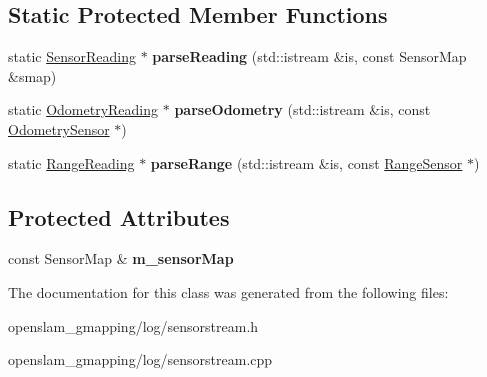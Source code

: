 \subsection*{Static Protected Member Functions}
\begin{DoxyCompactItemize}
\item 
\mbox{\label{classGMapping_1_1SensorStream_aa1a2469698bbe8264b6d0b49f1650615}} 
static \hyperlink{classGMapping_1_1SensorReading}{Sensor\+Reading} $\ast$ {\bfseries parse\+Reading} (std\+::istream \&is, const Sensor\+Map \&smap)
\item 
\mbox{\label{classGMapping_1_1SensorStream_aed9152731b2cd4a3c0a99cd0beca0c33}} 
static \hyperlink{classGMapping_1_1OdometryReading}{Odometry\+Reading} $\ast$ {\bfseries parse\+Odometry} (std\+::istream \&is, const \hyperlink{classGMapping_1_1OdometrySensor}{Odometry\+Sensor} $\ast$)
\item 
\mbox{\label{classGMapping_1_1SensorStream_a451ecf16c146ce840a6518f14b952d1e}} 
static \hyperlink{classGMapping_1_1RangeReading}{Range\+Reading} $\ast$ {\bfseries parse\+Range} (std\+::istream \&is, const \hyperlink{classGMapping_1_1RangeSensor}{Range\+Sensor} $\ast$)
\end{DoxyCompactItemize}
\subsection*{Protected Attributes}
\begin{DoxyCompactItemize}
\item 
\mbox{\label{classGMapping_1_1SensorStream_ad5753b33864d289f6fa3051ed2d9acb8}} 
const Sensor\+Map \& {\bfseries m\+\_\+sensor\+Map}
\end{DoxyCompactItemize}


The documentation for this class was generated from the following files\+:\begin{DoxyCompactItemize}
\item 
openslam\+\_\+gmapping/log/sensorstream.\+h\item 
openslam\+\_\+gmapping/log/sensorstream.\+cpp\end{DoxyCompactItemize}
